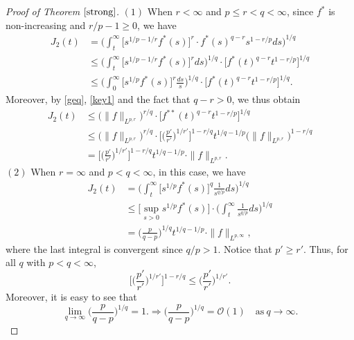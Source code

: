 \documentclass{birkjour}
\theoremstyle{definition}
\theoremstyle{remark}
\numberwithin{equation}{section}
\begin{document}
\begin{proof}[Proof of Theorem $\ref{strong}$]
$(1)$ When $r<\infty$ and $p\leq r<q<\infty$, since $f^{*}$ is non-increasing and $r/p-1\geq0$, we have
\begin{equation*}
\begin{split}
J_2(t)&=\bigg(\int_{t}^{\infty}\big[s^{1/p-1/r}f^{*}(s)\big]^r\cdot f^{*}(s)^{q-r}s^{1-r/p}ds\bigg)^{1/q}\\
&\leq\bigg(\int_{t}^{\infty}\big[s^{1/p-1/r}f^{*}(s)\big]^rds\bigg)^{1/q}\cdot \Big[f^{*}(t)^{q-r}t^{1-r/p}\Big]^{1/q}\\
&\leq\bigg(\int_{0}^{\infty}\big[s^{1/p}f^{*}(s)\big]^r\frac{ds}{s}\bigg)^{1/q}\cdot \Big[f^{*}(t)^{q-r}t^{1-r/p}\Big]^{1/q}.
\end{split}
\end{equation*}
Moreover, by \eqref{geq}, \eqref{key1} and the fact that $q-r>0$, we thus obtain
\begin{equation*}
\begin{split}
J_2(t)&\leq\big(\|f\|_{L^{p,r}}\big)^{r/q}
\cdot \Big[f^{**}(t)^{q-r}t^{1-r/p}\Big]^{1/q}\\
&\leq \big(\|f\|_{L^{p,r}}\big)^{r/q}
\cdot \Big[\Big(\frac{p'}{r'}\Big)^{1/{r'}}\Big]^{1-r/q}
t^{1/q-1/p}\big(\|f\|_{L^{p,r}}\big)^{1-r/q}\\
&=\Big[\Big(\frac{p'}{r'}\Big)^{1/{r'}}\Big]^{1-r/q}
t^{1/q-1/p}\cdot\|f\|_{L^{p,r}}.
\end{split}
\end{equation*}
$(2)$ When $r=\infty$ and $p<q<\infty$, in this case, we have
\begin{equation*}
\begin{split}
J_2(t)&=\bigg(\int_{t}^{\infty}\big[s^{1/p}f^{*}(s)\big]^{q}\frac{1}{s^{q/p}}ds\bigg)^{1/q}\\
&\leq\Big[\sup_{s>0}s^{1/p}f^{*}(s)\Big]\cdot\bigg(\int_{t}^{\infty}\frac{1}{s^{q/p}}ds\bigg)^{1/q}\\
&=\Big(\frac{p}{q-p}\Big)^{1/q} t^{1/q-1/p}\cdot\|f\|_{L^{p,\infty}},
\end{split}
\end{equation*}
where the last integral is convergent since $q/p>1$. Notice that $p'\geq r'$. Thus, for all $q$ with $p<q<\infty$,
\begin{equation*}
\Big[\Big(\frac{p'}{r'}\Big)^{1/{r'}}\Big]^{1-r/q}\leq\Big(\frac{p'}{r'}\Big)^{1/{r'}}.
\end{equation*}
Moreover, it is easy to see that
\begin{equation*}
\lim_{q\to\infty}\Big(\frac{p}{q-p}\Big)^{1/q}=1.\Longrightarrow \Big(\frac{p}{q-p}\Big)^{1/q}=\mathcal{O}(1)\quad \mbox{as}~ q\to\infty.

\end{equation*}
\end{proof}
\end{document}
